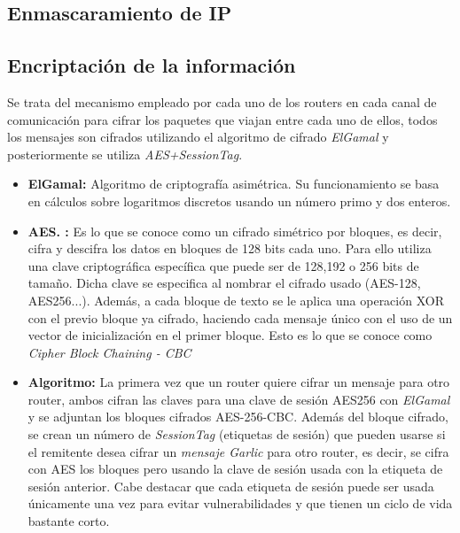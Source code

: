 \subsection{Enmascaramiento de IP}

\subsection{Encriptación de la información}

Se trata del mecanismo empleado por cada uno de los routers en cada canal de comunicación para cifrar los paquetes que viajan entre cada uno de ellos, todos los mensajes son cifrados utilizando el algoritmo de cifrado \textit{ElGamal} y posteriormente se utiliza \textit{AES+SessionTag}.


\begin{itemize}

\item \textbf{ElGamal:}
Algoritmo de criptografía asimétrica. Su funcionamiento se basa en cálculos sobre logaritmos discretos usando un número primo y dos enteros.   


\item \textbf{AES. :}
Es lo que se conoce como un cifrado simétrico por bloques, es decir, cifra y descifra los datos en bloques de 128 bits cada uno. Para ello utiliza una clave criptográfica específica que puede ser de 128,192 o 256 bits de tamaño. Dicha clave se especifica al nombrar el cifrado usado (AES-128, AES256...). Además, a cada bloque de texto se le aplica una operación XOR con el previo bloque ya cifrado, haciendo cada mensaje único con el uso de un vector de inicialización en el primer bloque. Esto es lo que se conoce como \textit{Cipher Block Chaining - CBC} 

\textit{}

\item \textbf{Algoritmo:} La primera vez que un router quiere cifrar un mensaje para otro router, ambos cifran las claves para una clave de sesión AES256 con \textit{ElGamal} y se adjuntan los bloques cifrados  AES-256-CBC.
Además del bloque cifrado, se crean un número de \textit{SessionTag} (etiquetas de sesión) que pueden usarse si el remitente desea cifrar un \textit{mensaje Garlic} para otro router, es decir, se cifra con AES los bloques pero usando la clave de sesión usada con la etiqueta de sesión anterior. 
Cabe destacar que cada etiqueta de sesión puede ser usada únicamente una vez para evitar vulnerabilidades y que tienen un ciclo de vida bastante corto.


\end{itemize}


